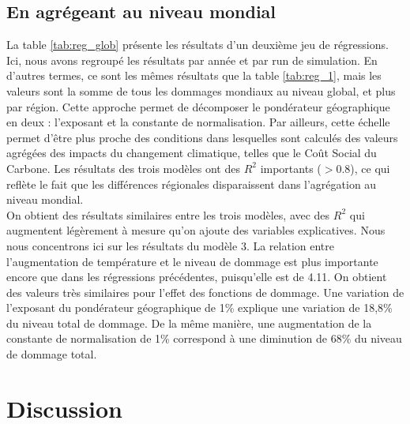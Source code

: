 \subsection{En agrégeant au niveau mondial}

\begin{table}
    \centering
    \resizebox{\textwidth}{!}{}
    \label{tab:reg_glob}
\end{table}

La table \ref{tab:reg_glob} présente les résultats d'un deuxième jeu de régressions. Ici, nous avons regroupé les résultats par année et par run de simulation. En d'autres termes, ce sont les mêmes résultats que la table \ref{tab:reg_1}, mais les valeurs sont la somme de tous les dommages mondiaux au niveau global, et plus par région. Cette approche permet de décomposer le pondérateur géographique en deux : l'exposant et la constante de normalisation. Par ailleurs, cette échelle permet d'être plus proche des conditions dans lesquelles sont calculés des valeurs agrégées des impacts du changement climatique, telles que le Coût Social du Carbone. Les résultats des trois modèles ont des $R^2$ importants ($>0.8$), ce qui reflète le fait que les différences régionales disparaissent dans l'agrégation au niveau mondial. \\

On obtient des résultats similaires entre les trois modèles, avec des $R^2$ qui augmentent légèrement à mesure qu'on ajoute des variables explicatives. Nous nous concentrons ici sur les résultats du modèle 3. La relation entre l'augmentation de température et le niveau de dommage est plus importante encore que dans les régressions précédentes, puisqu'elle est de 4.11. On obtient des valeurs très similaires pour l'effet des fonctions de dommage. Une variation de l'exposant du pondérateur géographique de 1\% explique une variation de 18,8\% du niveau total de dommage. De la même manière, une augmentation de la constante de normalisation de 1\% correspond à une diminution de 68\% du niveau de dommage total. 


\section{Discussion}







